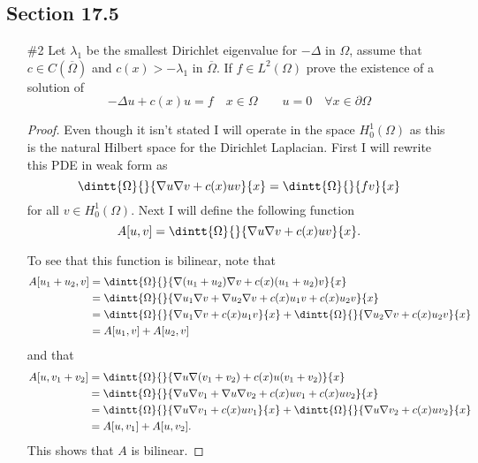 \documentclass[11pt, oneside]{article}
\begin{document}
\subsection*{Section 17.5}
\begin{enumerate}
  \item[\#2] %
    Let $\lambda_1$ be the smallest Dirichlet eigenvalue for $-\Delta$ in
    $\Omega$, assume that $c \in C(\overline{\Omega})$ and $c(x) > -\lambda_1$
    in $\overline{\Omega}$.
    If $f \in L^2(\Omega)$ prove the existence of a solution of
    \[
      -\Delta u + c(x) u = f \quad x \in \Omega \qquad u = 0 \quad \forall x \in \partial \Omega
    \]

    \begin{proof}
      Even though it isn't stated I will operate in the space $H^1_0(\Omega)$
      as this is the natural Hilbert space for the Dirichlet Laplacian.
      First I will rewrite this PDE in weak form as
      \[
        \dintt{\Omega}{}{\nabla u \nabla v + c(x) uv}{x} = \dintt{\Omega}{}{fv}{x}
      \]
      for all $v \in H^1_0(\Omega)$.
      Next I will define the following function
      \[
        A[u, v] = \dintt{\Omega}{}{\nabla u \nabla v + c(x) uv}{x}.
      \]

      To see that this function is bilinear, note that
      \begin{align*}
        A[u_1 + u_2, v] &= \dintt{\Omega}{}{\nabla (u_1 + u_2) \nabla v + c(x) (u_1 + u_2)v}{x} \\
        &= \dintt{\Omega}{}{\nabla u_1 \nabla v + \nabla u_2 \nabla v + c(x) u_1 v + c(x) u_2 v}{x} \\
        &= \dintt{\Omega}{}{\nabla u_1 \nabla v + c(x)u_1 v}{x} + \dintt{\Omega}{}{\nabla u_2 \nabla v + c(x) u_2 v}{x} \\
        &= A[u_1, v] + A[u_2, v]
      \end{align*}
      and that
      \begin{align*}
        A[u, v_1 + v_2] &= \dintt{\Omega}{}{\nabla u \nabla (v_1 + v_2) + c(x) u (v_1 + v_2)}{x} \\
        &= \dintt{\Omega}{}{\nabla u \nabla v_1 + \nabla u \nabla v_2 + c(x) u v_1 + c(x) u v_2}{x} \\
        &= \dintt{\Omega}{}{\nabla u \nabla v_1 + c(x) u v_1}{x} + \dintt{\Omega}{}{\nabla u \nabla v_2 + c(x) u v_2}{x} \\
        &= A[u, v_1] + A[u, v_2].
      \end{align*}
      This shows that $A$ is bilinear.


\end{proof}
\end{enumerate}
\end{document}
